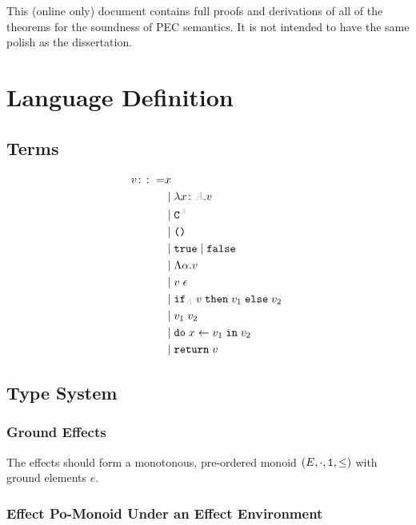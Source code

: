 \documentclass{report}
\begin{document}
\abstract

This (online only) document contains full proofs and derivations of all of the theorems for the soundness of PEC semantics. It is not intended to have the same polish as the dissertation.

\tableofcontents

\chapter{Language Definition}

\section{Terms}

\begin{equation}
    \begin{split}
        v \gens & x \\
        & \mid \lam{x}{A}{v} \\
        & \mid \const{A} \\
        & \mid \u \\
        & \mid \t \mid \f \\
        & \mid \elam{\a}{v} \\
        & \mid \eapp{v}{\e} \\
        & \mid \pifthenelse{A}{v}{v_1}{v_2} \\
        & \mid \apply{v_1}{v_2} \\
        & \mid \doin{x}{v_1}{v_2} \\
        & \mid \return{v}
    \end{split}
\end{equation}



\section{Type System}
\subsection{Ground Effects}
The effects should form a monotonous, pre-ordered monoid $(E, \cdot, \texttt{1}, \leq)$ with ground elements $e$.

\subsection{Effect Po-Monoid Under an Effect Environment}
\end{document}
